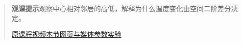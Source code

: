 \begin{quote}\small\textbf{观课提示}\quad 观察中心相对邻居的高低，解释为什么温度变化由空间二阶差分决定。

\href{https://www.youtube.com/watch?v=ly4S0oi3Yz8}{原课程视频}\quad\href{https://vitael04213.github.io/3blue1brown-notes/lessons/pdes.html}{本节网页与媒体}\quad\href{https://vitael04213.github.io/3blue1brown-notes/lab.html\#heat}{参数实验}
\end{quote}
